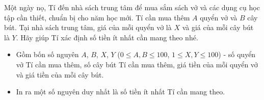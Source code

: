 \documentclass[12pt,a4paper,oneside]{article}
\begin{document}

\renewcommand{\baselinestretch}{1.25}
\setlength{\parskip}{1em}


Một ngày nọ, Tí đến nhà sách trung tâm để mua sắm sách vở và các dụng cụ học tập cần thiết, chuẩn bị cho năm học mới. Tí cần mua thêm $A$ quyển vở và $B$ cây bút. Tại nhà sách trung tâm, giá của mỗi quyển vở là $X$ và giá của mỗi cây bút là $Y$. Hãy giúp Tí xác định số tiền ít nhất cần mang theo nhé.


\setlength{\parskip}{0.25em}

\begin{itemize}
\item Gồm bốn số nguyên $A$, $B$, $X$, $Y$ ($0 \leq A, B \leq 100$, $1 \leq X, Y \leq 100$) - số quyển vở Tí cần mua thêm, số cây bút Tí cần mua thêm, giá tiền của mỗi quyển vở và giá tiền của mỗi cây bút.
\end{itemize}


\begin{itemize}
\item In ra một số nguyên duy nhất là số tiền ít nhất Tí cần mang theo.
\end{itemize}


\renewcommand{\baselinestretch}{1.0}
\begin{example}
\end{example}
\end{document}
